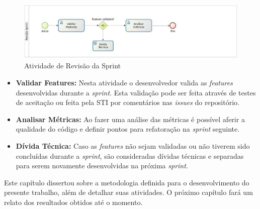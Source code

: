 \begin{figure}[ht]
	\centering
	\includegraphics[keepaspectratio=true,scale=0.9, width=\textwidth]{figuras/fig10.eps}
	\caption{Atividade de Revisão da Sprint}
	\label{fig10}
\end{figure}

\begin{itemize}

	\item \textbf{Validar Features:} Nesta atividade o desenvolvedor valida as \textit{features} desenvolvidas durante a \textit{sprint}. Esta validação pode ser feita através de testes de aceitação ou feita pela STI por comentários nas \textit{issues} do repositório.

	\item \textbf{Analisar Métricas:} Ao fazer uma análise das métricas é possível aferir a qualidade do código e definir pontos para refatoração na \textit{sprint} seguinte.

	\item \textbf{Dívida Técnica:} Caso as \textit{features} não sejam validadas ou não tiverem sido concluídas durante a \textit{sprint}, são consideradas dívidas técnicas e separadas para serem novamente desenvolvidas na próxima \textit{sprint}.

\end{itemize}

Este capítulo dissertou sobre a metodologia definida para o desenvolvimento do presente trabalho, além de detalhar suas atividades. O próximo capítulo fará um relato dos resultados obtidos até o momento.

